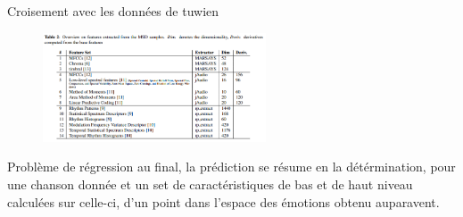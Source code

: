 \documentclass{beamer}
\begin{document}
\begin{frame}{Croisement avec les données de tuwien}
    \begin{figure}
        \centering
        \includegraphics[width=250px]{images/overview_on_features_extracted_from_msd.png}
    \end{figure}
\end{frame}

\begin{frame}{Problème de régression}
    au final, la prédiction se résume en la détérmination, pour une chanson
    donnée et un set de caractéristiques de bas et de haut niveau calculées
    sur celle-ci, d'un point dans l'espace des émotions obtenu auparavent.
\end{frame}
\end{document}
